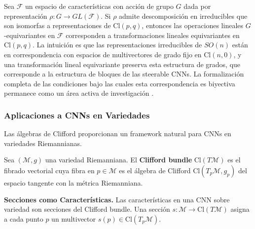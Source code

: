 \begin{remark}\label{thm:equiv_steerable_clifford}
Sea $\mathcal{F}$ un espacio de características con acción de grupo $G$ dada por representación $\rho: G \to GL(\mathcal{F})$. Si $\rho$ admite descomposición en irreducibles que son isomorfas a representaciones de $\text{Cl}(p,q)$, entonces las operaciones lineales $G$-equivariantes en $\mathcal{F}$ corresponden a transformaciones lineales equivariantes en $\text{Cl}(p,q)$. La intuición es que las representaciones irreducibles de $SO(n)$ están en correspondencia con espacios de multivectores de grado fijo en $\text{Cl}(n,0)$, y una transformación lineal equivariante preserva esta estructura de grados, que corresponde a la estructura de bloques de las steerable CNNs. La formalización completa de las condiciones bajo las cuales esta correspondencia es biyectiva permanece como un área activa de investigación \citep{brehmer2023geometric}.
\end{remark}

\subsubsection{Aplicaciones a CNNs en Variedades}

Las álgebras de Clifford proporcionan un framework natural para CNNs en variedades Riemannianas.

\begin{definition}\label{def:clifford_bundle}
Sea $(\mathcal{M}, g)$ una variedad Riemanniana. El \textbf{Clifford bundle} $\text{Cl}(T\mathcal{M})$ es el fibrado vectorial cuya fibra en $p \in \mathcal{M}$ es el álgebra de Clifford $\text{Cl}(T_p\mathcal{M}, g_p)$ del espacio tangente con la métrica Riemanniana.
\end{definition}

\textbf{Secciones como Características.}\label{rem:secciones_clifford} Las características en una CNN sobre variedad son secciones del Clifford bundle. Una sección $s: \mathcal{M} \to \text{Cl}(T\mathcal{M})$ asigna a cada punto $p$ un multivector $s(p) \in \text{Cl}(T_p\mathcal{M})$.

